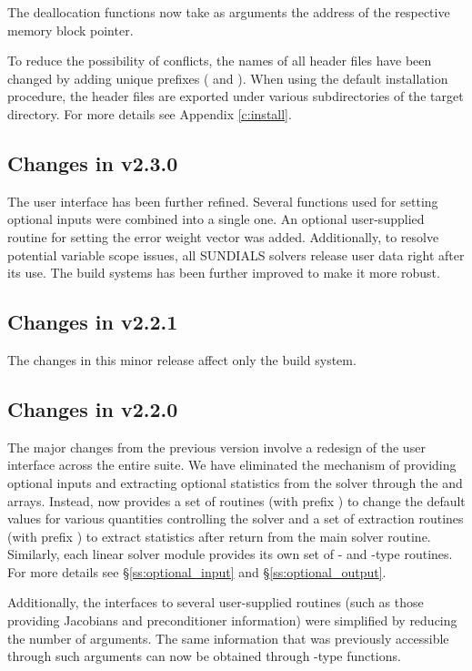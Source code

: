 The deallocation functions now take as arguments the address of the respective
memory block pointer.

To reduce the possibility of conflicts, the names of all header files have
been changed by adding unique prefixes ( and ).
When using the default installation procedure, the header files are exported
under various subdirectories of the target  directory. For more
details see Appendix \ref{c:install}.

\subsection*{Changes in v2.3.0}

The user interface has been further refined. Several functions used
for setting optional inputs were combined into a single one.  An optional
user-supplied routine for setting the error weight vector was added.
Additionally, to resolve potential variable scope issues, all
SUNDIALS solvers release user data right after its use. The build
systems has been further improved to make it more robust.

\subsection*{Changes in v2.2.1}

The changes in this minor {\sundials} release affect only the build system.

\subsection*{Changes in v2.2.0}

The major changes from the previous version involve a redesign of the
user interface across the entire {\sundials} suite. We have eliminated the
mechanism of providing optional inputs and extracting optional statistics
from the solver through the  and  arrays. Instead,
{\cvode} now provides a set of routines (with prefix )
to change the default values for various quantities controlling the
solver and a set of extraction routines (with prefix )
to extract statistics after return from the main solver routine.
Similarly, each linear solver module provides its own set of {-}
and {-type} routines. For more details see \S\ref{ss:optional_input}
and \S\ref{ss:optional_output}.

Additionally, the interfaces to several user-supplied routines
(such as those providing Jacobians and preconditioner information)
were simplified by reducing the number
of arguments. The same information that was previously accessible
through such arguments can now be obtained through {-type}
functions.

